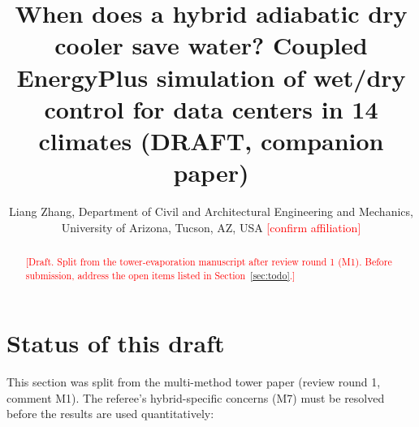 \documentclass[preprint,12pt,authoryear]{elsarticle}
\newcommand{\tbd}[1]{\textcolor{red}{[#1]}}
\begin{document}
\begin{frontmatter}
\title{When does a hybrid adiabatic dry cooler save water? Coupled EnergyPlus simulation of wet/dry control
for data centers in 14 climates (DRAFT, companion paper)}
\author{Liang Zhang, Department of Civil and Architectural Engineering and Mechanics, University of Arizona, Tucson, AZ, USA \tbd{confirm affiliation}}
\begin{abstract}
\tbd{Draft. Split from the tower-evaporation manuscript after review round 1 (M1). Before submission, address the
open items listed in Section~\ref{sec:todo}.}
\end{abstract}
\end{frontmatter}

\section{Status of this draft}\label{sec:todo}
This section was split from the multi-method tower paper (review round 1, comment M1). The referee's hybrid-specific
concerns (M7) must be resolved before the results are used quantitatively:
\end{document}
